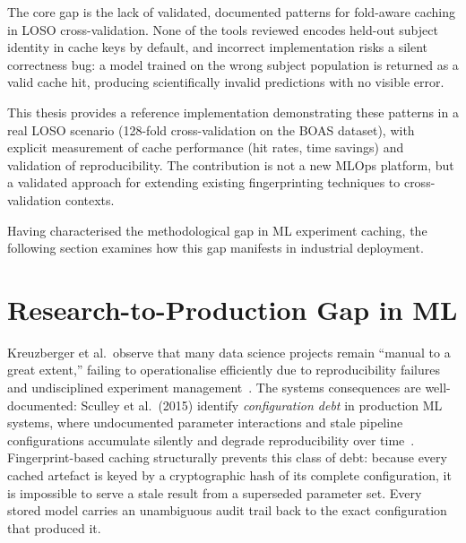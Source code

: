 The core gap is the lack of validated, documented patterns for fold-aware
caching in LOSO cross-validation. None of the tools reviewed encodes held-out
subject identity in cache keys by default, and incorrect implementation risks
a silent correctness bug: a model trained on the wrong subject population is
returned as a valid cache hit, producing scientifically invalid predictions
with no visible error.

This thesis provides a reference implementation demonstrating these patterns
in a real LOSO scenario (128-fold cross-validation on the BOAS dataset), with
explicit measurement of cache performance (hit rates, time savings) and
validation of reproducibility. The contribution is not a new MLOps platform,
but a validated approach for extending existing fingerprinting
techniques to cross-validation contexts.

Having characterised the methodological gap in ML experiment caching, the
following section examines how this gap manifests in industrial deployment.

\section{Research-to-Production Gap in ML}
\label{sec:related_industrial}

Kreuzberger et al.\ observe that many data science projects remain
``manual to a great extent,'' failing to operationalise efficiently due to
reproducibility failures and undisciplined experiment
management~\cite{kreuzberger2023mlops}. The systems consequences are
well-documented: Sculley et al.\ (2015) identify \textit{configuration debt}
in production ML systems, where undocumented parameter interactions and stale
pipeline configurations accumulate silently and degrade reproducibility over
time~\cite{sculley2015hidden}. Fingerprint-based caching structurally prevents
this class of debt: because every cached artefact is keyed by a cryptographic
hash of its complete configuration, it is impossible to serve a stale result
from a superseded parameter set. Every stored model carries an unambiguous
audit trail back to the exact configuration that produced it.
